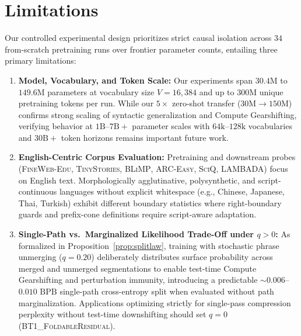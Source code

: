 \documentclass[11pt,a4paper]{article}
\begin{document}
\section*{Limitations}
Our controlled experimental design prioritizes strict causal isolation across $34$ from-scratch pretraining runs over frontier parameter counts, entailing three primary limitations:
\begin{enumerate}
    \item \textbf{Model, Vocabulary, and Token Scale:} Our experiments span $30.4\text{M}$ to $149.6\text{M}$ parameters at vocabulary size $V=16{,}384$ and up to $300\text{M}$ unique pretraining tokens per run. While our $5\times$ zero-shot transfer ($30\text{M} \to 150\text{M}$) confirms strong scaling of syntactic generalization and Compute Gearshifting, verifying behavior at $1\text{B}$--$7\text{B}+$ parameter scales with $64\text{k}$--$128\text{k}$ vocabularies and $30\text{B}+$ token horizons remains important future work.
    \item \textbf{English-Centric Corpus Evaluation:} Pretraining and downstream probes (\textsc{FineWeb-Edu}, \textsc{TinyStories}, \textsc{BLiMP}, \textsc{ARC-Easy}, \textsc{SciQ}, \textsc{LAMBADA}) focus on English text. Morphologically agglutinative, polysynthetic, and script-continuous languages without explicit whitespace (e.g., Chinese, Japanese, Thai, Turkish) exhibit different boundary statistics where right-boundary guards and prefix-cone definitions require script-aware adaptation.
    \item \textbf{Single-Path vs.\ Marginalized Likelihood Trade-Off under $q > 0$:} As formalized in Proposition~\ref{prop:splitlaw}, training with stochastic phrase unmerging ($q=0.20$) deliberately distributes surface probability across merged and unmerged segmentations to enable test-time Compute Gearshifting and perturbation immunity, introducing a predictable $\sim 0.006$--$0.010\text{ BPB}$ single-path cross-entropy split when evaluated without path marginalization. Applications optimizing strictly for single-pass compression perplexity without test-time downshifting should set $q=0$ (\textsc{BT1\_FoldableResidual}).
\end{enumerate}
\end{document}
